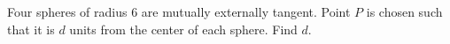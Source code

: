 Four spheres of radius $6$ are mutually externally tangent. Point $P$ is chosen such that it is $d$ units from the center of each sphere. Find $d$.
